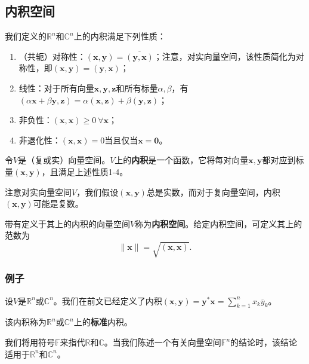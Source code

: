 \subsection{内积空间}\label{subsec:inner_prod}

我们定义的$\mathbb{R}^n$和$\mathbb{C}^n$上的内积满足下列性质：
\begin{enumerate}
    \item （共轭）对称性：$(\mathbf{x},\mathbf{y})={\overline{(\mathbf{y},\mathbf{x})}}$；注意，对实向量空间，该性质简化为对称性，即$(\mathbf{x},\mathbf{y})=(\mathbf{y},\mathbf{x})$；
    \item 线性：对于所有向量$\mathbf{x},\mathbf{y},\mathbf{z}$和所有标量$\alpha,\beta$，有$(\alpha\mathbf{x}+\beta\mathbf{y},\mathbf{z})=\alpha(\mathbf{x},\mathbf{z})+\beta(\mathbf{y},\mathbf{z})$；
    \item 非负性：$(\mathbf{x},\mathbf{x})\geq0\ \forall\mathbf{x}$；
    \item 非退化性：$(\mathbf{x},\mathbf{x})=0$当且仅当$\mathbf{x}=\mathbf{0}$。
\end{enumerate}

令$V$是（复或实）向量空间。$V$上的\textbf{内积}是一个函数，它将每对向量$\mathbf{x},\mathbf{y}$都对应到标量$(\mathbf{x},\mathbf{y})$，且满足上述性质1-4。

注意对实向量空间$V$，我们假设$(\mathbf{x},\mathbf{y})$总是实数，而对于复向量空间，内积$(\mathbf{x},\mathbf{y})$可能是复数。

带有定义于其上的内积的向量空间$V$称为\textbf{内积空间}。给定内积空间，可定义其上的范数为\[\|\mathbf{x}\|=\sqrt{(\mathbf{x},\mathbf{x})}.\]

\subsubsection{例子}

\begin{example}
    设$V$是$\mathbb{R}^n$或$\mathbb{C}^n$。我们在前文已经定义了内积$(\mathbf{x},\mathbf{y})=\mathbf{y}^*\mathbf{x}=\sum_{k=1}^nx_k\overline{y}_k$。

    该内积称为$\mathbb{R}^n$或$\mathbb{C}^n$上的{\bf 标准}内积。
\end{example}

我们将用符号$\mathbb{F}$来指代$\mathbb{R}$和$\mathbb{C}$。当我们陈述一个有关向量空间$\mathbb{F}^n$的结论时，该结论适用于$\mathbb{R}^n$和$\mathbb{C}^n$。

